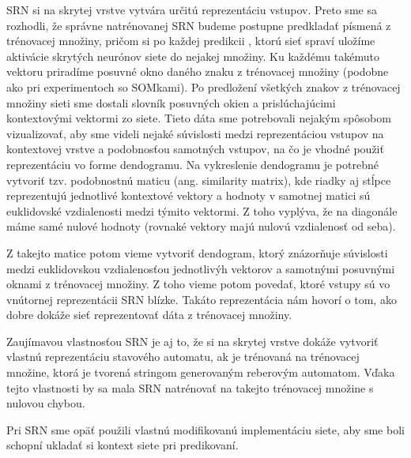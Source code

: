 SRN si na skrytej vrstve vytvára určitú reprezentáciu vstupov. Preto sme sa rozhodli, že 
správne natrénovanej SRN budeme postupne predkladať písmená z trénovacej množiny, pričom si po každej predikcii
, ktorú sieť spraví uložíme aktivácie skrytých neurónov siete do nejakej množiny. 
Ku každému takémuto vektoru priradíme posuvné okno daného znaku z trénovacej množiny (podobne ako pri experimentoch so SOMkami).
Po predložení všetkých znakov z trénovacej množiny sieti sme dostali slovník posuvných okien a prislúchajúcimi kontextovými vektormi
zo siete.
Tieto dáta sme potrebovali nejakým spôsobom vizualizovať, aby sme videli nejaké súvislosti medzi reprezentáciou vstupov na kontextovej vrstve a 
podobnosťou samotných vstupov, na čo je vhodné použiť reprezentáciu vo forme dendogramu.
Na vykreslenie dendogramu je potrebné vytvoriť tzv. podobnostnú maticu (ang. similarity matrix), kde 
riadky aj stĺpce reprezentujú jednotlivé kontextové vektory a hodnoty v samotnej matici sú euklidovské vzdialenosti medzi týmito vektormi.
Z toho vyplýva, že na diagonále máme samé nulové hodnoty (rovnaké vektory majú nulovú vzdialenosť od seba).


Z takejto matice potom vieme vytvoriť dendogram, ktorý znázorňuje súvislosti medzi euklidovskou vzdialenosťou jednotlivýh vektorov a samotnými posuvnými oknami z trénovacej množiny.
Z toho vieme potom povedať, ktoré vstupy sú vo vnútornej reprezentácii SRN blízke. 
Takáto reprezentácia nám hovorí o tom, ako dobre dokáže sieť reprezentovať dáta z trénovacej množiny.





Zaujímavou vlastnosťou SRN je aj to, že si na skrytej vrstve dokáže vytvoriť vlastnú reprezentáciu stavového automatu, ak 
je trénovaná na trénovacej množine, ktorá je tvorená stringom generovaným reberovým automatom. Vďaka tejto vlastnosti
by sa mala SRN natrénovať na takejto trénovacej množine s nulovou chybou.



Pri SRN sme opäť použili vlastnú modifikovanú implementáciu siete, aby sme boli schopní
ukladať si kontext siete pri predikovaní.






